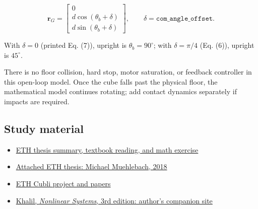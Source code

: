 \documentclass[
]{article}
\providecommand{\tightlist}{%
  \setlength{\itemsep}{0pt}\setlength{\parskip}{0pt}}
\begin{document}
\[\mathbf r_G=
\begin{bmatrix}
0\\d\cos(\theta_b+\delta)\\d\sin(\theta_b+\delta)
\end{bmatrix},
\qquad \delta=\texttt{com\_angle\_offset}.\]

With \(\delta=0\) (printed Eq. (7)), upright is \(\theta_b=90^\circ\);
with \(\delta=\pi/4\) (Eq. (6)), upright is \(45^\circ\).

There is no floor collision, hard stop, motor saturation, or feedback
controller in this open-loop model. Once the cube falls past the
physical floor, the mathematical model continues rotating; add contact
dynamics separately if impacts are required.

\subsection{Study material}\label{study-material}

\begin{itemize}
\tightlist
\item
  \href{Ref/STUDY.md}{ETH thesis summary, textbook reading, and math
  exercise}
\item
  \href{Ref/phdthesisE-Collection.pdf}{Attached ETH thesis: Michael
  Muehlebach, 2018}
\item
  \href{https://idsc.ethz.ch/research-dandrea/research-projects/archive/cubli.html}{ETH
  Cubli project and papers}
\item
  \href{https://www.egr.msu.edu/~khalil/NonlinearSystems/index.html}{Khalil,
  \emph{Nonlinear Systems}, 3rd edition: author's companion site}
\end{itemize}
\end{document}

